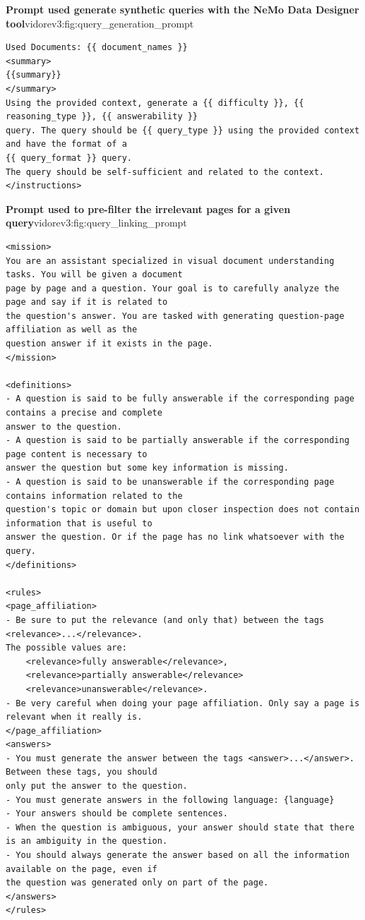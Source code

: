 \begin{promptfigure}{\textbf{Prompt used generate synthetic queries with the NeMo Data Designer tool}}{vidorev3:fig:query_generation_prompt}
\begin{Verbatim}[breaklines=true,breakanywhere=true,fontsize=\tiny]
Used Documents: {{ document_names }}
<summary>
{{summary}}
</summary>
Using the provided context, generate a {{ difficulty }}, {{ reasoning_type }}, {{ answerability }}
query. The query should be {{ query_type }} using the provided context and have the format of a 
{{ query_format }} query.
The query should be self-sufficient and related to the context.
</instructions>
\end{Verbatim}
\end{promptfigure}

\begin{promptfigure}{\textbf{Prompt used to pre-filter the irrelevant pages for a given query}}{vidorev3:fig:query_linking_prompt}

\begin{Verbatim}[breaklines=true,breakanywhere=true,fontsize=\scriptsize]
<mission>
You are an assistant specialized in visual document understanding tasks. You will be given a document
page by page and a question. Your goal is to carefully analyze the page and say if it is related to
the question's answer. You are tasked with generating question-page affiliation as well as the
question answer if it exists in the page. 
</mission>

<definitions>
- A question is said to be fully answerable if the corresponding page contains a precise and complete
answer to the question.
- A question is said to be partially answerable if the corresponding page content is necessary to
answer the question but some key information is missing.
- A question is said to be unanswerable if the corresponding page contains information related to the
question's topic or domain but upon closer inspection does not contain information that is useful to
answer the question. Or if the page has no link whatsoever with the query.
</definitions>

<rules>
<page_affiliation>
- Be sure to put the relevance (and only that) between the tags <relevance>...</relevance>.
The possible values are: 
    <relevance>fully answerable</relevance>,
    <relevance>partially answerable</relevance>
    <relevance>unanswerable</relevance>.
- Be very careful when doing your page affiliation. Only say a page is relevant when it really is.
</page_affiliation>
<answers>
- You must generate the answer between the tags <answer>...</answer>. Between these tags, you should
only put the answer to the question.
- You must generate answers in the following language: {language}
- Your answers should be complete sentences.
- When the question is ambiguous, your answer should state that there is an ambiguity in the question.
- You should always generate the answer based on all the information available on the page, even if
the question was generated only on part of the page.
</answers>
</rules>


\end{Verbatim}
\end{promptfigure}
